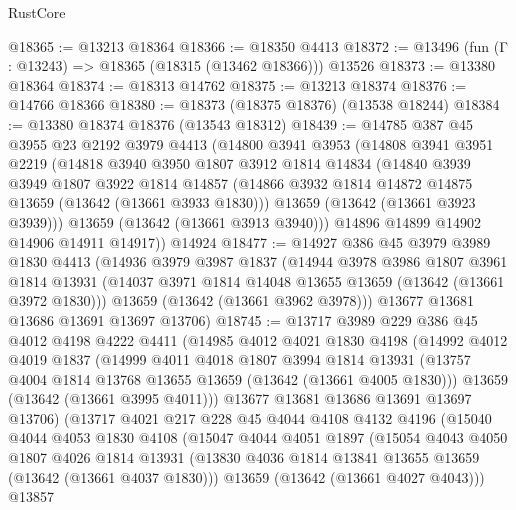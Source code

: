\begin{lexlean}{RustCore}
\begin{coremodule}
@18365 := @13213 @18364
@18366 := @18350 @4413
@18372 := @13496 (fun (Γ : @13243) => @18365 (@18315 (@13462 @18366))) @13526
@18373 := @13380 @18364
@18374 := @18313 @14762
@18375 := @13213 @18374
@18376 := @14766 @18366
@18380 := @18373 (@18375 @18376) (@13538 @18244)
@18384 := @13380 @18374 @18376 (@13543 @18312)
@18439 := @14785
    @387
    @45
    @3955
    @23
    @2192
    @3979
    @4413
    (@14800
      @3941
      @3953
      (@14808
        @3941
        @3951
        @2219
        (@14818
          @3940
          @3950
          @1807
          @3912
          @1814
          @14834
          (@14840
            @3939
            @3949
            @1807
            @3922
            @1814
            @14857
            (@14866 @3932 @1814 @14872 @14875 @13659 (@13642 (@13661 @3933 @1830)))
            @13659
            (@13642 (@13661 @3923 @3939)))
          @13659
          (@13642 (@13661 @3913 @3940)))
        @14896
        @14899
        @14902
        @14906
        @14911
        @14917))
    @14924
@18477 := @14927
    @386
    @45
    @3979
    @3989
    @1830
    @4413
    (@14936
      @3979
      @3987
      @1837
      (@14944
        @3978
        @3986
        @1807
        @3961
        @1814
        @13931
        (@14037 @3971 @1814 @14048 @13655 @13659 (@13642 (@13661 @3972 @1830)))
        @13659
        (@13642 (@13661 @3962 @3978)))
      @13677
      @13681
      @13686
      @13691
      @13697
      @13706)
@18745 := @13717
    @3989
    @229
    @386
    @45
    @4012
    @4198
    @4222
    @4411
    (@14985
      @4012
      @4021
      @1830
      @4198
      (@14992
        @4012
        @4019
        @1837
        (@14999
          @4011
          @4018
          @1807
          @3994
          @1814
          @13931
          (@13757 @4004 @1814 @13768 @13655 @13659 (@13642 (@13661 @4005 @1830)))
          @13659
          (@13642 (@13661 @3995 @4011)))
        @13677
        @13681
        @13686
        @13691
        @13697
        @13706)
      (@13717
        @4021
        @217
        @228
        @45
        @4044
        @4108
        @4132
        @4196
        (@15040
          @4044
          @4053
          @1830
          @4108
          (@15047
            @4044
            @4051
            @1897
            (@15054
              @4043
              @4050
              @1807
              @4026
              @1814
              @13931
              (@13830 @4036 @1814 @13841 @13655 @13659 (@13642 (@13661 @4037 @1830)))
              @13659
              (@13642 (@13661 @4027 @4043)))
            @13857

\end{coremodule}
\end{lexlean}
